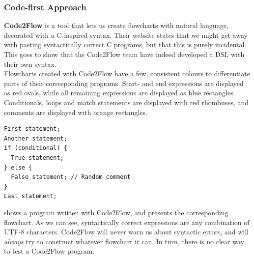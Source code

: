 \subsubsection{Code-first Approach}

\textbf{Code2Flow} is a tool that lets us create flowcharts with natural language, decorated with a C-inspired syntax. Their website states that we might get away with pasting syntactically correct C programs, but that this is purely incidental. This goes to show that the Code2Flow team have indeed developed a DSL with their own syntax. \\

Flowcharts created with Code2Flow have a few, consistent colours to differentiate parts of their corresponding programs. Start- and end expressions are displayed as red ovals, while all remaining expressions are displayed as blue rectangles. Conditionals, loops and match statements are displayed with red rhombuses, and comments are displayed with orange rectangles. \\

\begin{lstlisting}[caption={A Code2Flow program.}, captionpos=b, label={A Code2Flow program.}]
First statement;
Another statement;
if (conditional) {
  True statement;
} else {
  False statement; // Random comment
}
Last statement;
\end{lstlisting}

 shows a program written with Code2Flow, and  presents the corresponding flowchart. As we can see, syntactically correct expressions are any combination of UTF-8 characters. Code2Flow will never warn us about syntactic errors, and will \textit{always} try to construct whatever flowchart it can. In turn, there is no clear way to test a Code2Flow program. \\

